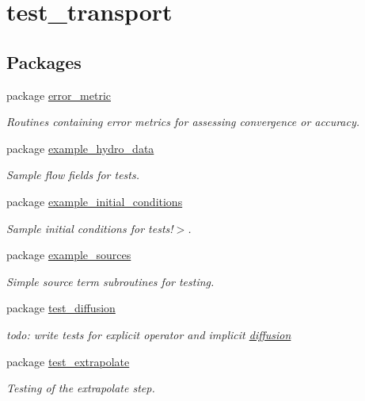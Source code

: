 \hypertarget{a00045}{
\section{test\_\-transport}
\label{a00045}
}
\subsection*{Packages}
\begin{CompactItemize}
\item 
package \hyperlink{a00028}{error\_\-metric}
\begin{CompactList}\small\item\em Routines containing error metrics for assessing convergence or accuracy. \item\end{CompactList}

\item 
package \hyperlink{a00029}{example\_\-hydro\_\-data}
\begin{CompactList}\small\item\em Sample flow fields for tests. \item\end{CompactList}

\item 
package \hyperlink{a00030}{example\_\-initial\_\-conditions}
\begin{CompactList}\small\item\em Sample initial conditions for tests!$>$. \item\end{CompactList}

\item 
package \hyperlink{a00031}{example\_\-sources}
\begin{CompactList}\small\item\em Simple source term subroutines for testing. \item\end{CompactList}

\item 
package \hyperlink{a00039}{test\_\-diffusion}
\begin{CompactList}\small\item\em todo: write tests for explicit operator and implicit \hyperlink{a00027}{diffusion} \item\end{CompactList}

\item 
package \hyperlink{a00040}{test\_\-extrapolate}
\begin{CompactList}\small\item\em Testing of the extrapolate step. \item\end{CompactList}


\end{CompactItemize}
